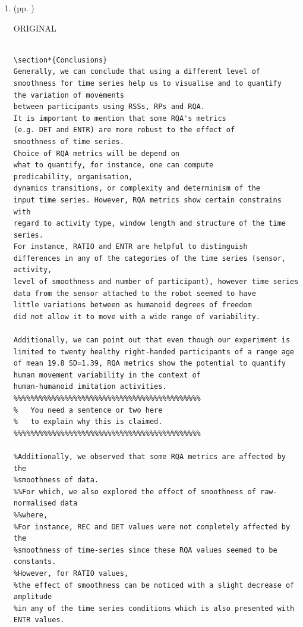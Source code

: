 \documentclass[10pt]{article}
\begin{document}
\begin{enumerate}


\item  (pp. ) 

ORIGINAL
\begin{verbatim}

\section*{Conclusions}
Generally, we can conclude that using a different level of 
smoothness for time series help us to visualise and to quantify 
the variation of movements 
between participants using RSSs, RPs and RQA. 
It is important to mention that some RQA's metrics 
(e.g. DET and ENTR) are more robust to the effect of 
smoothness of time series.
Choice of RQA metrics will be depend on 
what to quantify, for instance, one can compute 
predicability, organisation,  
dynamics transitions, or complexity and determinism of the 
input time series. However, RQA metrics show certain constrains with 
regard to activity type, window length and structure of the time series.
For instance, RATIO and ENTR are helpful to distinguish 
differences in any of the categories of the time series (sensor, activity, 
level of smoothness and number of participant), however time series
data from the sensor attached to the robot seemed to have 
little variations between as humanoid degrees of freedom 
did not allow it to move with a wide range of variability. 

Additionally, we can point out that even though our experiment is 
limited to twenty healthy right-handed participants of a range age 
of mean 19.8 SD=1.39, RQA metrics show the potential to quantify 
human movement variability in the context of 
human-humanoid imitation activities.
%%%%%%%%%%%%%%%%%%%%%%%%%%%%%%%%%%%%%%%%%%%%
%	You need a sentence or two here
%	to explain why this is claimed.
%%%%%%%%%%%%%%%%%%%%%%%%%%%%%%%%%%%%%%%%%%%%
	
%Additionally, we observed that some RQA metrics are affected by the 
%smoothness of data. 
%%For which, we also explored the effect of smoothness of raw-normalised data 
%%where, 
%For instance, REC and DET values were not completely affected by the 
%smoothness of time-series since these RQA values seemed to be constants. 
%However, for RATIO values, 
%the effect of smoothness can be noticed with a slight decrease of amplitude 
%in any of the time series conditions which is also presented with ENTR values.




\end{verbatim}
\end{enumerate}
\end{document}

